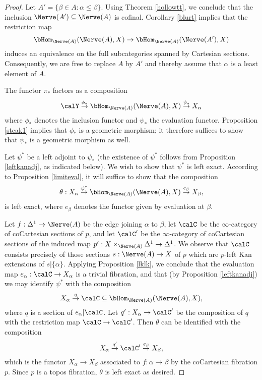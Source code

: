 \begin{proof}
Let $A' = \{ \beta \in A: \alpha \leq \beta \}$. Using Theorem \ref{hollowtt}, we conclude that
the inclusion $\Nerve(A') \subseteq \Nerve(A)$ is cofinal. Corollary \ref{blurt} implies that
the restriction map
$$ \bHom_{ \Nerve(A)}( \Nerve(A), X) \rightarrow \bHom_{\Nerve(A)}(\Nerve(A'), X)$$
induces an equivalence on the full subcategories spanned by Cartesian sections. Consequently, we are free to replace $A$ by $A'$ and thereby assume that $\alpha$ is a least element of $A$.

The functor $\pi_{\ast}$ factors as a composition
$$ \calY \stackrel{\phi_{\ast}}{\rightarrow} \bHom_{ \Nerve(A)}( \Nerve(A), X) \stackrel{\psi_{\ast}}{\rightarrow}
X_{\alpha}$$
where $\phi_{\ast}$ denotes the inclusion functor and $\psi_{\ast}$ the evaluation functor.
Proposition \ref{steak1} implies that $\phi_{\ast}$ is a geometric morphism; it therefore suffices to show that $\psi_{\ast}$ is a geometric morphism as well. 

Let $\psi^{\ast}$ be a left adjoint to $\psi_{\ast}$ (the existence of $\psi^{\ast}$ follows from Proposition \ref{leftkanadj}, as indicated below). We wish to show that $\psi^{\ast}$ is left exact. According to Proposition \ref{limiteval}, it will suffice to show that the composition
$$ \theta: X_{\alpha} \stackrel{\psi^{\ast}}{\rightarrow} \bHom_{ \Nerve(A)}( \Nerve(A), X) 
\stackrel{e_{\beta}}{\rightarrow} X_{\beta},$$
is left exact, where $e_{\beta}$ denotes the functor given by evaluation at $\beta$.

Let $f: \Delta^1 \rightarrow \Nerve(A)$ be the edge joining $\alpha$ to $\beta$, let
$\calC$ be the $\infty$-category of coCartesian sections of $p$, and let
$\calC'$ be the $\infty$-category of coCartesian sections of the induced map
$p': X \times_{ \Nerve(A)} \Delta^1 \rightarrow \Delta^1$. We observe that
$\calC$ consists precisely of those sections $s: \Nerve(A) \rightarrow X$ of $p$ which
are $p$-left Kan extensions of $s | \{ \alpha \}$. Applying Proposition \ref{lklk},
we conclude that the evaluation map $e_{\alpha}: \calC \rightarrow X_{\alpha}$ is a trivial fibration, and that (by Proposition \ref{leftkanadj}) we may identify $\psi^{\ast}$ with the composition
$$ X_{\alpha} \stackrel{q}{\rightarrow} \calC \subseteq \bHom_{\Nerve(A)}(\Nerve(A),X),$$
where $q$ is a section of $e_{\alpha}|\calC$. Let $q': X_{\alpha} \rightarrow \calC'$
be the composition of $q$ with the restriction map $\calC \rightarrow \calC'$. Then
$\theta$ can be identified with the composition
$$ X_{\alpha} \stackrel{q'}{\rightarrow} \calC' \stackrel{e_{\beta}}{\rightarrow} X_{\beta},$$
which is the functor $X_{\alpha} \rightarrow X_{\beta}$ associated to $f: \alpha \rightarrow \beta$ by the coCartesian fibration $p$. Since $p$ is a topos fibration, $\theta$ is left exact as desired.
\end{proof}

